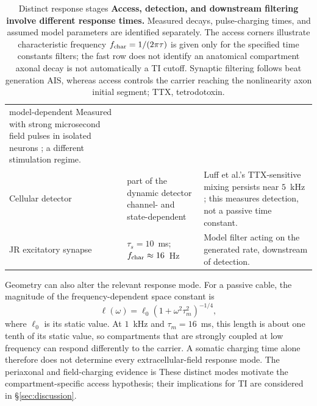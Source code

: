 \documentclass[11pt,a4paper]{article}
\providecommand{\DIFaddtex}[1]{{\protect\color{blue} \sf #1}} %
\providecommand{\DIFdeltex}[1]{{\protect\color{red} \scriptsize #1}} %
\providecommand{\DIFaddbegin}{} %
\providecommand{\DIFaddend}{} %
\providecommand{\DIFdelbegin}{} %
\providecommand{\DIFdelend}{} %
\providecommand{\DIFaddFL}[1]{\DIFadd{#1}} %
\providecommand{\DIFdelFL}[1]{\DIFdel{#1}} %
\providecommand{\DIFaddbeginFL}{} %
\providecommand{\DIFaddendFL}{} %
\providecommand{\DIFdelbeginFL}{} %
\providecommand{\DIFdelendFL}{} %
\providecommand{\DIFadd}[1]{\texorpdfstring{\DIFaddtex{#1}}{#1}} %
\providecommand{\DIFdel}[1]{\texorpdfstring{\DIFdeltex{#1}}{}} %
\begin{document}
\begin{table}[h]
\begin{tabular}{@{}>{\raggedright\arraybackslash}p{2.8cm}
>{\raggedright\arraybackslash}p{3.5cm}
>{\raggedright\arraybackslash}p{8.6cm}@{}}
\DIFdelbeginFL \DIFdelFL{model-dependent }\DIFdelendFL \DIFaddbeginFL \DIFaddFL{Measured with strong microsecond field pulses in isolated neurons
\cite{semenov2025}; a different stimulation regime. }\\
\DIFaddFL{Cellular detector }\DIFaddendFL & \DIFdelbeginFL \DIFdelFL{part of the dynamic detector }\DIFdelendFL \DIFaddbeginFL \DIFaddFL{channel- and state-dependent }&
\DIFaddFL{Luff et al.'s TTX-sensitive mixing persists near $5$~kHz
\cite{luff2024mixer}; this measures detection, not a passive time constant. }\DIFaddendFL \\
\DIFaddbeginFL \DIFaddFL{JR excitatory synapse }& \DIFaddFL{$\tau_s=10$~ms; $f_{\rm char}\approx16$~Hz }&
\DIFaddFL{Model filter acting on the generated rate, downstream of detection. }\\
\DIFaddendFL \bottomrule
\end{tabular}
\caption{\DIFdelbeginFL \DIFdelFL{Distinct response stages}\DIFdelendFL \DIFaddbeginFL \DIFaddFL{\textbf{Access, detection, and downstream filtering involve different response
times.} Measured decays, pulse-charging times, and assumed model parameters are
identified separately}\DIFaddendFL . The \DIFdelbeginFL \DIFdelFL{access corners illustrate }\DIFdelendFL \DIFaddbeginFL \DIFaddFL{characteristic frequency $f_{\rm char}=1/(2\pi\tau)$
is given only for the }\DIFaddendFL specified \DIFdelbeginFL \DIFdelFL{time
constants}\DIFdelendFL \DIFaddbeginFL \DIFaddFL{filters}\DIFaddendFL ; \DIFdelbeginFL \DIFdelFL{the fast row does not identify }\DIFdelendFL an \DIFdelbeginFL \DIFdelFL{anatomical compartment}\DIFdelendFL \DIFaddbeginFL \DIFaddFL{axonal decay is not automatically a TI
cutoff}\DIFaddendFL . \DIFdelbeginFL \DIFdelFL{Synaptic
filtering follows beat generation}\DIFdelendFL \DIFaddbeginFL \DIFaddFL{AIS}\DIFaddendFL , \DIFdelbeginFL \DIFdelFL{whereas access controls the carrier reaching
the nonlinearity}\DIFdelendFL \DIFaddbeginFL \DIFaddFL{axon initial segment; TTX, tetrodotoxin}\DIFaddendFL .}
\label{tab:doors}
\end{table}

Geometry can also alter the relevant response mode. For a passive cable, the
magnitude of the frequency-dependent space constant is
\begin{equation}
\ell(\omega)=\ell_0(1+\omega^2\tau_m^2)^{-1/4},
\label{eq:lambda}
\end{equation}
where $\ell_0$ is its static value. At $1$~kHz and $\tau_m=16$~ms, this length
is about one tenth of its static value, so compartments that are strongly coupled
at low frequency can respond differently to the carrier. A somatic charging time
alone therefore does not determine every extracellular-field response mode.
\DIFdelbegin \DIFdel{The periaxonal and field-charging evidence is }\DIFdelend \DIFaddbegin \DIFadd{These distinct modes motivate the compartment-specific access hypothesis; their
implications for TI are }\DIFaddend considered in \S\ref{sec:discussion}.
\end{document}
